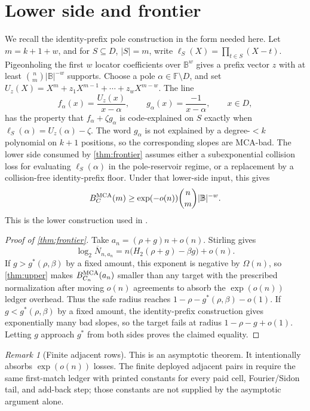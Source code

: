 \documentclass[11pt,a4paper]{amsart}
\numberwithin{equation}{section}
\theoremstyle{remark}
\newtheorem{remark}[theorem]{Remark}
\newcommand{\F}{\mathbb F}
\newcommand{\B}{\mathbb B}
\newcommand{\barN}{\overline N}
\begin{document}
\section{Lower side and frontier}

We recall the identity-prefix pole construction in the form needed here.  Let \(m=k+1+w\), and for \(S\subseteq D\), \(|S|=m\), write \(\ell_S(X)=\prod_{t\in S}(X-t)\).  Pigeonholing the first \(w\) locator coefficients over \(\B^w\) gives a prefix vector \(z\) with at least \(\binom nm|\B|^{-w}\) supports.  Choose a pole \(\alpha\in\F\setminus D\), and set \(U_z(X)=X^m+z_1X^{m-1}+\cdots+z_wX^{m-w}\).  The line
\[
        f_\alpha(x)=\frac{U_z(x)}{x-\alpha},
        \qquad
        g_\alpha(x)=\frac{-1}{x-\alpha},
        \qquad x\in D,
\]
has the property that \(f_\alpha+\zeta g_\alpha\) is code-explained on \(S\) exactly when \(\ell_S(\alpha)=U_z(\alpha)-\zeta\).  The word \(g_\alpha\) is not explained by a degree-\(<k\) polynomial on \(k+1\) positions, so the corresponding slopes are MCA-bad.  The lower side consumed by \cref{thm:frontier} assumes either a subexponential collision loss for evaluating \(\ell_S(\alpha)\) in the pole-reservoir regime, or a replacement by a collision-free identity-prefix floor.  Under that lower-side input, this gives
\[
        B_C^{\rm MCA}(m)\ge \exp(-o(n))\binom nm|\B|^{-w}.
\]
This is the lower construction used in \cite{Cho26CapV13,Cho26Grande}.

\begin{proof}[Proof of \cref{thm:frontier}]
Take \(a_n=(\rho+g)n+o(n)\).  Stirling gives
\[
        \log_2\barN_{n,a_n}
        = n\bigl(H_2(\rho+g)-\beta g\bigr)+o(n).
\]
If \(g>g^*(\rho,\beta)\) by a fixed amount, this exponent is negative by \(\Omega(n)\), so \cref{thm:upper} makes \(B_{C_n}^{\rm MCA}(a_n)\) smaller than any target with the prescribed normalization after moving \(o(n)\) agreements to absorb the \(\exp(o(n))\) ledger overhead.  Thus the safe radius reaches \(1-\rho-g^*(\rho,\beta)-o(1)\).  If \(g<g^*(\rho,\beta)\) by a fixed amount, the identity-prefix construction gives exponentially many bad slopes, so the target fails at radius \(1-\rho-g+o(1)\).  Letting \(g\) approach \(g^*\) from both sides proves the claimed equality.
\end{proof}

\begin{remark}[Finite adjacent rows]
This is an asymptotic theorem.  It intentionally absorbs \(\exp(o(n))\) losses.  The finite deployed adjacent pairs in \cite{Cho26CapV13,Cho26Grande} require the same first-match ledger with printed constants for every paid cell, Fourier/Sidon tail, and add-back step; those constants are not supplied by the asymptotic argument alone.
\end{remark}
\end{document}
